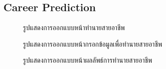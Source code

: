 \subsection{Career Prediction}
\begin{figure}[H]\centering
    \caption{รูปแสดงการออกแบบหน้าทำนายสายอาชีพ}\label{fig:CP.png}
\end{figure}
\begin{figure}[H]\centering
    \caption{รูปแสดงการออกแบบหน้ากรอกข้อมูลเพื่อทำนายสายอาชีพ}\label{fig:CP-input.png}
\end{figure}
\begin{figure}[H]\centering
    \caption{รูปแสดงการออกแบบหน้าผลลัพธ์การทำนายสายอาชีพ}\label{fig:CP-result.png}
\end{figure}
